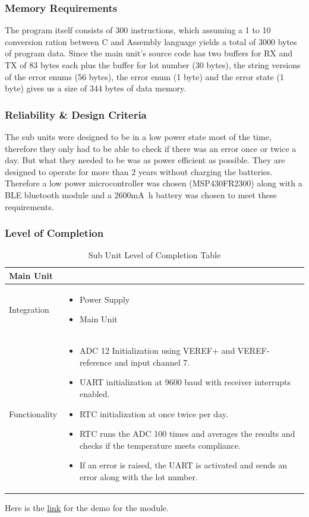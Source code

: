 \subsubsection{Memory Requirements}
The program itself consists of 300 instructions, which assuming a 1 to 10 conversion ration between C and Assembly language yields a total of 3000 bytes of program data. Since the main unit's source code has two buffers for RX and TX of 83 bytes each plus the buffer for lot number (30 bytes), the string versions of the error enums (56 bytes), the error enum (1 byte) and the error state (1 byte) gives us a size of 344 bytes of data memory.
\subsubsection{Reliability \& Design Criteria}
The sub units were designed to be in a low power state most of the time, therefore they only had to be able to check if there was an error once or twice a day. But what they needed to be was as power efficient as possible. They are designed to operate for more than 2 years without charging the batteries. Therefore a low power microcontroller was chosen (MSP430FR2300) along with a BLE bluetooth module and a 2600\si{\milli\ampere\hour} battery was chosen to meet these requirements.
\begin{landscape}
\subsubsection{Level of Completion}
  \begin{table}[!ht]
    \begin{tabularx}{\textwidth}{|X|X|}
      \hline
      \multicolumn{2}{|X|}{Main Unit}\\
      \hline
      Integration&\begin{itemize}
                    \item Power Supply
                    \item Main Unit
                  \end{itemize}\\
                  \hline
      Functionality&\begin{itemize}
          \item ADC 12 Initialization using VEREF+ and VEREF- reference and input channel 7.
          \item UART initialization at 9600 baud with receiver interrupts enabled.
          \item RTC initialization at once twice per day.
          \item RTC runs the ADC 100 times and averages the results and checks if the temperature meets compliance.
          \item If an error is raised, the UART is activated and sends an error along with the lot number.
        \end{itemize}\\
      \hline
    \end{tabularx}
    \caption{Sub Unit Level of Completion Table}
    \label{tab:sub-unit-modular-completion-table}
  \end{table}
\end{landscape}
Here is the \href{https://youtu.be/BvUFnom23P8}{link} for the demo for the module.
